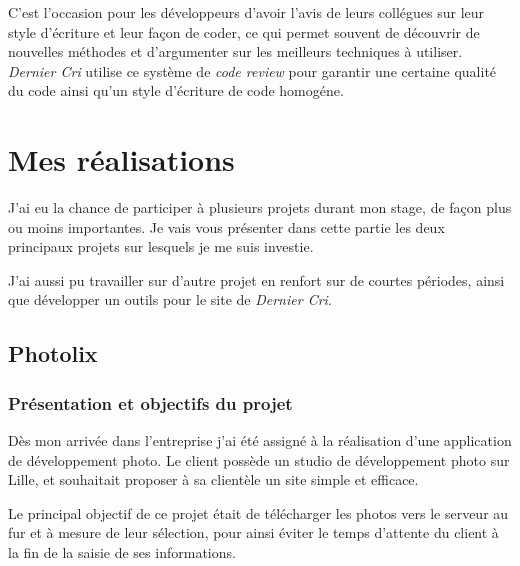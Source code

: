 \documentclass[12pt,a4paper]{article}
\begin{document}
  \bigskip

  C'est l'occasion pour les développeurs d'avoir l'avis de leurs collégues
  sur leur style d'écriture et leur façon de coder, ce qui permet souvent
  de découvrir de nouvelles méthodes et d'argumenter sur les meilleurs
  techniques à utiliser. \emph{Dernier Cri} utilise ce système de
  \emph{code review} pour garantir une certaine qualité du code ainsi
  qu'un style d'écriture de code homogéne.

  \newpage

  \section{Mes réalisations}\label{mes-ruxe9alisations}

  \bigskip

  J'ai eu la chance de participer à plusieurs projets durant mon stage, de
  façon plus ou moins importantes. Je vais vous présenter dans cette
  partie les deux principaux projets sur lesquels je me suis investie.

  \bigskip

  J'ai aussi pu travailler sur d'autre projet en renfort sur de courtes
  périodes, ainsi que développer un outils pour le site de \emph{Dernier
  Cri}.

  \bigskip

  \subsection{Photolix}\label{photolix}

  \subsubsection{Présentation et objectifs du
  projet}\label{pruxe9sentation-et-objectifs-du-projet}

  \bigskip

  Dès mon arrivée dans l'entreprise j'ai été assigné à la réalisation
  d'une application de développement photo. Le client possède un studio de
  développement photo sur Lille, et souhaitait proposer à sa clientèle un
  site simple et efficace.

  \bigskip

  Le principal objectif de ce projet était de télécharger les photos vers
  le serveur au fur et à mesure de leur sélection, pour ainsi éviter le
  temps d'attente du client à la fin de la saisie de ses informations.
\end{document}
